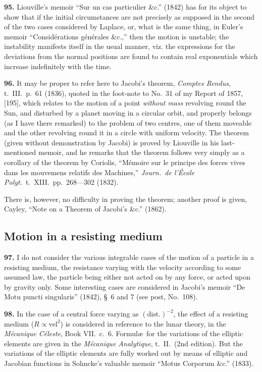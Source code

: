 \documentclass[11pt,a4paper]{book}
\begin{document}
\textbf{95.} Liouville's memoir ``Sur un cas particulier \&c.'' (1842) has for its object to show that if the initial circumstances are not precisely as supposed in the second of the two cases considered by Laplace, or, what is the same thing, in Euler's memoir ``Consid\'erations g\'en\'erales \&c.,'' then the motion is unstable; the instability manifests itself in the usual manner, viz. the expressions for the deviations from the normal positions are found to contain real exponentials which increase indefinitely with the time.

\textbf{96.} It may be proper to refer here to Jacobi's theorem, \textit{Comptes Rendus}, t.~III.~p.~61 (1836), quoted in the foot-note to No.~31 of my Report of 1857, [195], which relates to the motion of a point \textit{without mass} revolving round the Sun, and disturbed by a planet moving in a circular orbit, and properly belongs (as I have there remarked) to the problem of two centres, one of them moveable and the other revolving round it in a circle with uniform velocity. The theorem (given without demonstration by Jacobi) is proved by Liouville in his last-mentioned memoir, and he remarks that the theorem follows very simply as a corollary of the theorem by Coriolis, ``M\'emoire sur le principe des forces vives dans les mouvemens relatifs des Machines,'' \textit{Journ.\ de l'\'Ecole Polyt.}\ t.~XIII.~pp.~268---302 (1832).

There is, however, no difficulty in proving the theorem; another proof is given, Cayley, ``Note on a Theorem of Jacobi's \&c.'' (1862).

\subsection*{Motion in a resisting medium}

\textbf{97.} I do not consider the various integrable cases of the motion of a particle in a resisting medium, the resistance varying with the velocity according to some assumed law, the particle being either not acted on by any force, or acted upon by gravity only. Some interesting cases are considered in Jacobi's memoir ``De Motu puncti singularis'' (1842), \S~6 and 7 (see post, No.~108).

\textbf{98.} In the case of a central force varying as $(\text{dist.})^{-2}$, the effect of a resisting medium ($R \propto \text{vel}^2$) is considered in reference to the lunar theory, in the \textit{M\'ecanique C\'eleste}, Book VII.~c.~6. Formul\ae\ for the variations of the elliptic elements are given in the \textit{M\'ecanique Analytique}, t.~II.~(2nd edition). But the variations of the elliptic elements are fully worked out by means of elliptic and Jacobian functions in Sohncke's valuable memoir ``Motus Corporum \&c.'' (1833).
\end{document}
